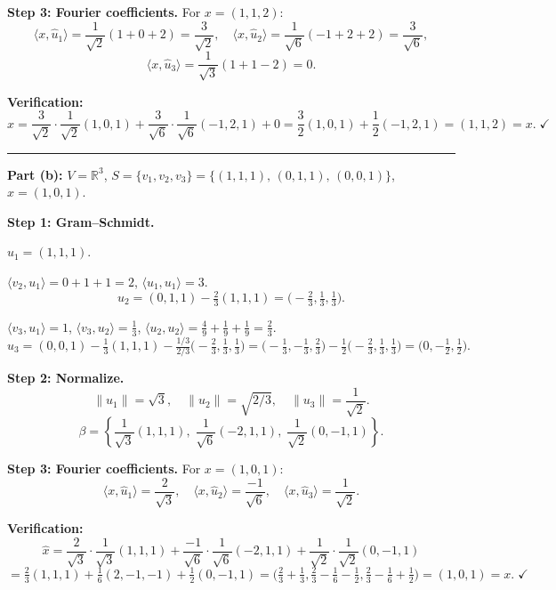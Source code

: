 \documentclass{article}
\begin{document}
\begin{mdframed}[linewidth=1pt]
\textbf{Step 3: Fourier coefficients.} For $x = (1,1,2)$:
\[
\langle x, \hat{u}_1 \rangle = \frac{1}{\sqrt{2}}(1+0+2) = \frac{3}{\sqrt{2}}, \quad \langle x, \hat{u}_2 \rangle = \frac{1}{\sqrt{6}}(-1+2+2) = \frac{3}{\sqrt{6}},
\]
\[
\langle x, \hat{u}_3 \rangle = \frac{1}{\sqrt{3}}(1+1-2) = 0.
\]

\textbf{Verification:}
\[
\hat{x} = \frac{3}{\sqrt{2}} \cdot \frac{1}{\sqrt{2}}(1,0,1) + \frac{3}{\sqrt{6}} \cdot \frac{1}{\sqrt{6}}(-1,2,1) + 0 = \frac{3}{2}(1,0,1) + \frac{1}{2}(-1,2,1) = (1,1,2) = x. \;\checkmark
\]

\bigskip
\hrule
\bigskip

\textbf{Part (b):} $V = \mathbb{R}^3$, $S = \{v_1,v_2,v_3\} = \{(1,1,1),\,(0,1,1),\,(0,0,1)\}$, $x = (1,0,1)$.

\textbf{Step 1: Gram--Schmidt.}

$u_1 = (1,1,1)$.

$\langle v_2, u_1 \rangle = 0+1+1 = 2$, $\langle u_1, u_1 \rangle = 3$.
\[
u_2 = (0,1,1) - \tfrac{2}{3}(1,1,1) = \bigl(-\tfrac{2}{3}, \tfrac{1}{3}, \tfrac{1}{3}\bigr).
\]

$\langle v_3, u_1 \rangle = 1$, $\langle v_3, u_2 \rangle = \tfrac{1}{3}$, $\langle u_2, u_2 \rangle = \tfrac{4}{9}+\tfrac{1}{9}+\tfrac{1}{9} = \tfrac{2}{3}$.
\[
u_3 = (0,0,1) - \tfrac{1}{3}(1,1,1) - \tfrac{1/3}{2/3}\bigl(-\tfrac{2}{3},\tfrac{1}{3},\tfrac{1}{3}\bigr) = \bigl(-\tfrac{1}{3},-\tfrac{1}{3},\tfrac{2}{3}\bigr) - \tfrac{1}{2}\bigl(-\tfrac{2}{3},\tfrac{1}{3},\tfrac{1}{3}\bigr) = \bigl(0, -\tfrac{1}{2}, \tfrac{1}{2}\bigr).
\]

\textbf{Step 2: Normalize.}
\[
\|u_1\| = \sqrt{3}, \quad \|u_2\| = \sqrt{2/3}, \quad \|u_3\| = \frac{1}{\sqrt{2}}.
\]
\[
\beta = \left\{ \frac{1}{\sqrt{3}}(1,1,1),\; \frac{1}{\sqrt{6}}(-2,1,1),\; \frac{1}{\sqrt{2}}(0,-1,1) \right\}.
\]

\textbf{Step 3: Fourier coefficients.} For $x = (1,0,1)$:
\[
\langle x, \hat{u}_1 \rangle = \frac{2}{\sqrt{3}}, \quad \langle x, \hat{u}_2 \rangle = \frac{-1}{\sqrt{6}}, \quad \langle x, \hat{u}_3 \rangle = \frac{1}{\sqrt{2}}.
\]

\textbf{Verification:}
\[
\hat{x} = \frac{2}{\sqrt{3}}\cdot\frac{1}{\sqrt{3}}(1,1,1) + \frac{-1}{\sqrt{6}}\cdot\frac{1}{\sqrt{6}}(-2,1,1) + \frac{1}{\sqrt{2}}\cdot\frac{1}{\sqrt{2}}(0,-1,1)
\]
\[
= \tfrac{2}{3}(1,1,1) + \tfrac{1}{6}(2,-1,-1) + \tfrac{1}{2}(0,-1,1) = \bigl(\tfrac{2}{3}+\tfrac{1}{3}, \tfrac{2}{3}-\tfrac{1}{6}-\tfrac{1}{2}, \tfrac{2}{3}-\tfrac{1}{6}+\tfrac{1}{2}\bigr) = (1, 0, 1) = x. \;\checkmark
\]


\end{mdframed}
\end{document}
